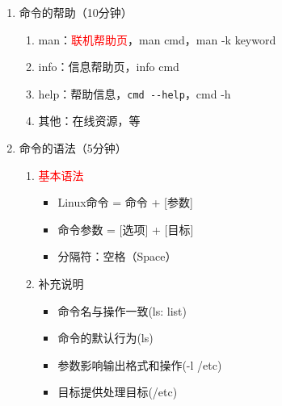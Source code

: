 \documentclass{TIJMUjiaoanSY}
\begin{document}


\firstTail


\newpage
\otherHeader

\noindent
\begin{enumerate}
  \item 命令的帮助（10分钟）
    \begin{enumerate}
      \item man：\textcolor{red}{联机帮助页}，man cmd，man -k keyword
      \item info：信息帮助页，info cmd
      \item help：帮助信息，\verb|cmd --help|，cmd -h
      \item 其他：在线资源，等
    \end{enumerate}
  \item 命令的语法（5分钟）
    \begin{enumerate}
      \item \textcolor{red}{基本语法}
        \begin{itemize}
	  \item Linux命令 = 命令 + [参数]
	  \item 命令参数 = [选项] + [目标]
	  \item 分隔符：空格（Space）
	\end{itemize}
      \item 补充说明
	\begin{itemize}
	  \item 命令名与操作一致(ls: list)
	  \item 命令的默认行为(ls)
	  \item 参数影响输出格式和操作(-l /etc)
	  \item 目标提供处理目标(/etc)

\end{itemize}
\end{enumerate}
\end{enumerate}
\end{document}
